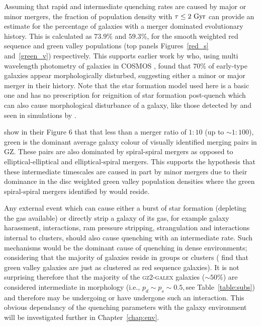 Assuming that rapid and intermediate quenching rates are caused by major or minor mergers, the fraction of population density with $\tau \leq 2~\rm{Gyr}$ can provide an estimate for the percentage of galaxies with a merger dominated evolutionary history.  This is calculated as $73.9\%$ and $59.3\%$, for the smooth weighted red sequence and green valley populations (top panels Figures~\ref{red_s} and~\ref{green_v}) respectively. This supports earlier work by \cite{kaviraj11} who, using multi wavelength photometry of galaxies in COSMOS \citep{Scoville07}, found that $70\%$ of early-type galaxies appear morphologically disturbed, suggesting either a minor or major merger in their history. Note that the star formation model used here is a basic one and has no prescription for reignition of star formation post-quench which can also cause morphological disturbance of a galaxy, like those detected by \cite{kaviraj11} and seen in simulations by \cite{pontzen16}.

\citet{Darg10a} show in their Figure 6 that that less than a merger ratio of $1:10$ (up to $\sim 1:100$), green is the dominant average galaxy colour of visually identified merging pairs in GZ. These pairs are also dominated by spiral-spiral mergers as opposed to elliptical-elliptical and elliptical-spiral mergers. This supports the hypothesis that these intermediate timescales are caused in part by minor mergers due to their dominance in the disc weighted green valley population densities where the green spiral-spiral mergers identified by \citet{Darg10a} would reside. 

Any external event which can cause either a burst of star formation (depleting the gas available) or directly strip a galaxy of its gas, for example galaxy harassment, interactions, ram pressure stripping, strangulation and interactions internal to clusters, should also cause quenching with an intermediate rate. Such mechanisms would be the dominant cause of quenching in dense environments; considering that the majority of galaxies reside in groups or clusters (\citealt{Coil08} find that green valley galaxies are just as clustered as red sequence galaxies). It is not surprising therefore that the majority of the \textsc{gz2-galex} galaxies ($\sim50\%$) are considered intermediate in morphology (i.e., $p_d \sim p_s \sim 0.5, $see Table~\ref{table:subs}) and therefore may be undergoing or have undergone such an interaction. This obvious dependancy of the quenching parameters with the galaxy environment will be investigated further in Chapter~\ref{chap:env}.


